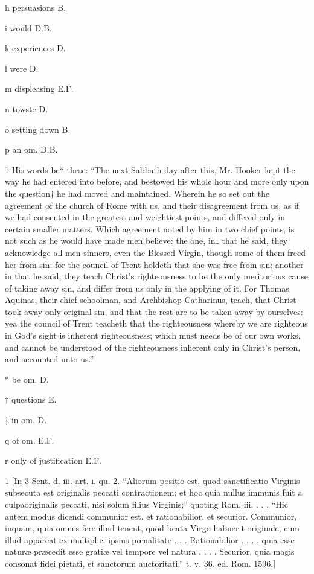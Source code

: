 h
persuasions B.

i
would D.B.

k
experiences D.

l
were D.

m
displeasing E.F.

n
towste D.

o
setting down B.

p
an om. D.B.

1
His words be* these: “The next Sabbath-day after this, Mr. Hooker kept the way he had entered into before, and bestowed his whole hour and more only upon the question† he had moved and maintained. Wherein he so set out the agreement of the church of Rome with us, and their disagreement from us, as if we had consented in the greatest and weightiest points, and differed only in certain smaller matters. Which agreement noted by him in two chief points, is not such as he would have made men believe: the one, in‡ that he said, they acknowledge all men sinners, even the Blessed Virgin, though some of them freed her from sin: for the council of Trent holdeth that she was free from sin: another in that he said, they teach Christ’s righteousness to be the only meritorious cause of taking away sin, and differ from us only in the applying of it. For Thomas Aquinas, their chief schoolman, and Archbishop Catharinus, teach, that Christ took away only original sin, and that the rest are to be taken away by ourselves: yea the council of Trent teacheth that the righteousness whereby we are righteous in God’s sight is inherent righteousness; which must needs be of our own works, and cannot be understood of the righteousness inherent only in Christ’s person, and accounted unto us.”

*
be om. D.

†
questions E.

‡
in om. D.

q
of om. E.F.

r
only of justification E.F.

1
[In 3 Sent. d. iii. art. i. qu. 2. “Aliorum positio est, quod sanctificatio Virginis subsecuta est originalis peccati contractionem; et hoc quia nullus immunis fuit a culpaoriginalis peccati, nisi solum filius Virginis;” quoting Rom. iii. . . . “Hic autem modus dicendi communior est, et rationabilior, et securior. Communior, inquam, quia omnes fere illud tenent, quod beata Virgo habuerit originale, cum illud appareat ex multiplici ipsius pœnalitate . . . Rationabilior . . . . quia esse naturæ præcedit esse gratiæ vel tempore vel natura . . . . Securior, quia magis consonat fidei pietati, et sanctorum auctoritati.” t. v. 36. ed. Rom. 1596.]

